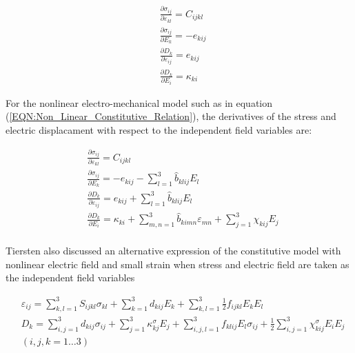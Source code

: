 \begin{equation}
\begin{aligned}
&\frac{\partial \sigma_{ij}}{\partial \varepsilon_{kl}}=C_{ijkl} \\
&\frac{\partial \sigma_{ij}}{\partial E_{k}}=-e_{kij} \\
&\frac{\partial D_{k}}{\partial\varepsilon_{ij}}=e_{kij} \\
&\frac{\partial D_{k}}{\partial E_{i}}=\kappa_{ki}
\end{aligned}
\label{EQN:Linear_Constants}
\end{equation}

For the nonlinear electro-mechanical model such as in equation (\ref{EQN:Non_Linear_Constitutive_Relation}),
the derivatives of the stress and electric displacament with respect to the independent field variables are:

\begin{equation}
\begin{aligned}
&\frac{\partial \sigma_{ij}}{\partial \varepsilon_{kl}}=C_{ijkl} \\
&\frac{\partial \sigma_{ij}}{\partial E_{k}}=
-e_{kij}-
\sum_{l=1}^3 \hat{b}_{klij} E_l\\
&\frac{\partial D_{k}}{\partial \varepsilon_{ij}}=
e_{kij}+
\sum_{l=1}^3 \hat{b}_{klij} E_l \\
&\frac{\partial D_{k}}{\partial E_{i}}=
\kappa_{ki}+
\sum_{m,n=1}^3 \hat{b}_{kimn}\varepsilon _{mn}+
\sum_{j=1}^3 \chi_{kij} E_j\\
\end{aligned}
\label{EQN:Non_LinearLinear_Constants}
\end{equation}

Tiersten \cite{tiersten1993electroelastic} also discussed an alternative expression of the constitutive model with nonlinear electric field and small strain when stress and 
 electric field are taken as the independent field variables

\begin{equation}
\begin{aligned}
&\varepsilon _{ij} = 
\sum_{k,l=1}^3 {S_{ijkl}}{\sigma_{kl}} + 
\sum_{k=1}^3 d_{kij}{E_k} +
\sum_{k,l=1}^3 \frac{1}{2}{f}_{ijkl}{E_k}{E_l}\\
&{D_k} =  
\sum_{i,j=1}^3 {d_{kij}}{\sigma_{ij}} + 
\sum_{j=1}^3 {\kappa^{\sigma}_{kj}}{E_j}+
\sum_{i,j,l=1}^3 {f}_{klij}{E_l} \sigma _{ij}+\frac{1}{2} 
\sum_{i,j=1}^3 \chi^{\sigma}_{kij}{E_i}{E_j} \\
& (i,j,k=1 \dots 3)  
\end{aligned}
\label{EQN:Non_Linear_Constitutive_Relation_strain_bases}
\end{equation}

